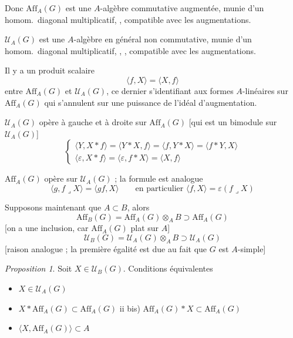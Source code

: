 \documentclass[11pt,a4paper]{article}
\begin{document}
Donc \struck{\ill{}} $\mathrm{Aff}_A(G)$ est une $A$-algèbre commutative
augmentée, munie d'un homom.\ diagonal multiplicatif, ,
compatible avec les augmentations.

$\mathcal{U}_A(G)$ est une $A$-algèbre en général non commutative, munie d'un
homom.\ diagonal multiplicatif, , ,
compatible avec les augmentations.

Il y a un produit scalaire
\[
\langle f, X \rangle = \langle X, f \rangle
\]
entre $\mathrm{Aff}_A(G)$ et $\mathcal{U}_A(G)$, ce dernier s'identifiant
aux formes $A$-linéaires sur $\mathrm{Aff}_A(G)$ qui s'annulent sur une
puissance de l'idéal d'augmentation.

$\mathcal{U}_A(G)$ opère à gauche et à droite sur $\mathrm{Aff}_A(G)$
[qui est un bimodule sur $\mathcal{U}_A(G)$]
\[
\left\lbrace
\begin{array}{l}
\langle Y, X * f \rangle = \langle Y * X, f \rangle = \langle f, Y * X \rangle
= \langle f * Y, X \rangle \\
\langle \varepsilon, X * f \rangle = \langle \varepsilon, f * X \rangle
= \langle X, f \rangle
\end{array}
\right.
\]


$\mathrm{Aff}_A(G)$ opère  sur
$\mathcal{U}_A(G)$ ; la formule est 
analogue
\[
\langle g, f \lrcorner X \rangle = \langle gf, X \rangle
\qquad \text{en particulier } \langle f, X \rangle = \varepsilon(f \lrcorner X)
\]

Supposons maintenant que $A \subset B$, alors
\[
\mathrm{Aff}_B(G) = \mathrm{Aff}_A(G) \otimes_A B \supset \mathrm{Aff}_A(G)
\]
[on a une inclusion, car $\mathrm{Aff}_A(G)$ plat sur $A$]
\[
\mathcal{U}_B(G) = \mathcal{U}_A(G) \otimes_A B \supset \mathcal{U}_A(G)
\]
[raison analogue ; la première égalité est due au fait que $G$ est
$A$-simple]

\emph{Proposition 1}. Soit $X \in \mathcal{U}_B(G)$. Conditions équivalentes
\begin{itemize}
  \item[i)] $X \in \mathcal{U}_A(G)$
  \item[ii)] $X * \mathrm{Aff}_A(G) \subset \mathrm{Aff}_A(G)$ \qquad
  ii bis) $\mathrm{Aff}_A(G) * X \subset \mathrm{Aff}_A(G)$
  \item[iii)] $\langle X, \mathrm{Aff}_A(G) \rangle \subset A$
\end{itemize}
\end{document}
